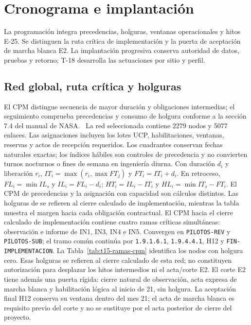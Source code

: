 \section{Cronograma e implantación} %
La programación integra precedencias, holguras, ventanas operacionales y hitos E-25. Se distinguen la ruta crítica de implementación y la puerta de aceptación de marcha blanca E2. La implantación progresiva conserva autoridad de datos, pruebas y retorno; T-18 desarrolla las actuaciones por sitio y perfil.




\subsection{Red global, ruta crítica y holguras} %
El CPM distingue secuencia de mayor duración y obligaciones intermedias; el seguimiento comprueba precedencias y consumo de holgura conforme a la sección 7.4 del manual de NASA.~\parencite[pp.~59--60]{nasa-cronograma} La red seleccionada contiene 2279 nodos y 5077 enlaces. Las asignaciones incluyen los lotes UCP, habilitaciones, ventanas, reservas y actos de recepción requeridos. Los cuadrantes conservan fechas naturales exactas; los índices hábiles son controles de precedencia y no convierten turnos nocturnos o fines de semana en ingeniería diurna.
Con duración $d_i$ y liberación $r_i$, $IT_i=\max(r_i,\max FT_j)$ y $FT_i=IT_i+d_i$. En retroceso, $FL_i=\min IL_s$ y $IL_i=FL_i-d_i$; $HT_i=IL_i-IT_i$ y $HL_i=\min IT_s-FT_i$. El CPM de precedencias y la asignación con capacidad son cálculos distintos. Las holguras de  se refieren al cierre calculado de implementación, mientras la tabla muestra el margen hacia cada obligación contractual.
El CPM hacia el cierre calculado de implementación contiene cuatro ramas críticas simultáneas: observación e informe de IN1, IN3, IN4 e IN5. Convergen en \texttt{PILOTOS-REV} y \texttt{PILOTOS-SUB}; el tramo común continúa por \texttt{1.9.1.6.1}, \texttt{1.9.4.4.1}, H12 y \texttt{FIN-IMPLEMENTACION}. La Tabla~\ref{tab:t15-ramas-cpm} identifica los nodos con holgura cero. Esas holguras se refieren al cierre calculado de esta red; no constituyen autorización para desplazar los hitos intermedios ni el acta/corte E2. El corte E2 tiene además una puerta rígida: cierre natural de observación, acta expresa de marcha blanca y habilitación lógica al inicio de 21, sin holgura. La aceptación final H12 conserva su ventana dentro del mes 21; el acta de marcha blanca es requisito previo del corte y no se sustituye por el acta posterior de cierre del proyecto.

